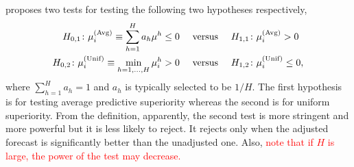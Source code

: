 \documentclass[12pt]{article}
\theoremstyle{definition}
\theoremstyle{definition}
\begin{document}
\cite{quaedvlieg2021multi}  proposes two tests for testing the following two hypotheses respectively,
\begin{align*}
  H_{0,1}\colon \mu^{(\rm Avg)}_i \equiv  \sum_{h=1}^H a_h \mu^h\leq 0 
  \quad &\text{ versus }
  \quad H_{1,1}\colon \mu^{(\rm Avg)}_i > 0\\
  H_{0,2}\colon \mu^{(\rm Unif)}_i \equiv  \min_{h=1, \ldots, H} \mu^h_i  > 0 
  \quad &\text{ versus }
  \quad H_{1,2}\colon \mu^{(\rm Unif)}_i  \leq  0,
\end{align*}
where $\sum_{h=1}^H a_h =1$ and $a_h$ is typically selected to be $1/H$. The first hypothesis is for testing average predictive superiority whereas the second is for uniform superiority. From the definition, apparently, the second test is more stringent and more powerful but it is less likely to reject. It rejects only when the adjusted forecast is significantly better than the unadjusted one. Also, \textcolor{red}{\cite{quaedvlieg2021multi} note that if $H$ is large, the power of the test may decrease.}
\end{document}
